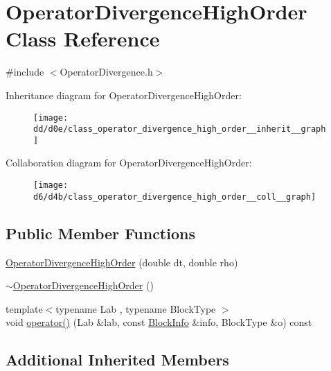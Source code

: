 \hypertarget{class_operator_divergence_high_order}{}\section{Operator\+Divergence\+High\+Order Class Reference}
\label{class_operator_divergence_high_order}


{\ttfamily \#include $<$Operator\+Divergence.\+h$>$}



Inheritance diagram for Operator\+Divergence\+High\+Order\+:\nopagebreak
\begin{figure}[H]
\begin{center}
\leavevmode
\texttt{[image: dd/d0e/class\_operator\_divergence\_high\_order\_\_inherit\_\_graph]}
\end{center}
\end{figure}


Collaboration diagram for Operator\+Divergence\+High\+Order\+:\nopagebreak
\begin{figure}[H]
\begin{center}
\leavevmode
\texttt{[image: d6/d4b/class\_operator\_divergence\_high\_order\_\_coll\_\_graph]}
\end{center}
\end{figure}
\subsection*{Public Member Functions}
\begin{DoxyCompactItemize}
\item 
\hyperlink{class_operator_divergence_high_order_aba5019b17ebf12926fca631c503dd21d}{Operator\+Divergence\+High\+Order} (double dt, double rho)
\item 
\hyperlink{class_operator_divergence_high_order_a022a0d3cc7413724ca51f54f411c701e}{$\sim$\+Operator\+Divergence\+High\+Order} ()
\item 
{\footnotesize template$<$typename Lab , typename Block\+Type $>$ }\\void \hyperlink{class_operator_divergence_high_order_a9e4c5786679fb26492c19a8ef2fe1051}{operator()} (Lab \&lab, const \hyperlink{struct_block_info}{Block\+Info} \&info, Block\+Type \&o) const 
\end{DoxyCompactItemize}
\subsection*{Additional Inherited Members}


